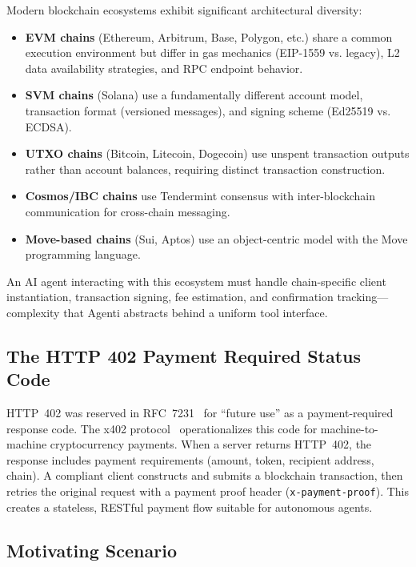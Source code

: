 \documentclass[11pt]{article}
\begin{document}
Modern blockchain ecosystems exhibit significant architectural diversity:

\begin{itemize}[leftmargin=*]
  \item \textbf{EVM chains} (Ethereum, Arbitrum, Base, Polygon, etc.) share a common execution environment but differ in gas mechanics (EIP-1559 vs. legacy), L2 data availability strategies, and RPC endpoint behavior.
  \item \textbf{SVM chains} (Solana) use a fundamentally different account model, transaction format (versioned messages), and signing scheme (Ed25519 vs. ECDSA).
  \item \textbf{UTXO chains} (Bitcoin, Litecoin, Dogecoin) use unspent transaction outputs rather than account balances, requiring distinct transaction construction.
  \item \textbf{Cosmos/IBC chains} use Tendermint consensus with inter-blockchain communication for cross-chain messaging.
  \item \textbf{Move-based chains} (Sui, Aptos) use an object-centric model with the Move programming language.
\end{itemize}

An AI agent interacting with this ecosystem must handle chain-specific client instantiation, transaction signing, fee estimation, and confirmation tracking---complexity that Agenti abstracts behind a uniform tool interface.

\subsection{The HTTP 402 Payment Required Status Code}

HTTP~402 was reserved in RFC~7231~\cite{rfc7231} for ``future use'' as a payment-required response code. The x402 protocol~\cite{coinbase2024x402} operationalizes this code for machine-to-machine cryptocurrency payments. When a server returns HTTP~402, the response includes payment requirements (amount, token, recipient address, chain). A compliant client constructs and submits a blockchain transaction, then retries the original request with a payment proof header (\texttt{x-payment-proof}). This creates a stateless, RESTful payment flow suitable for autonomous agents.

\subsection{Motivating Scenario}
\end{document}
